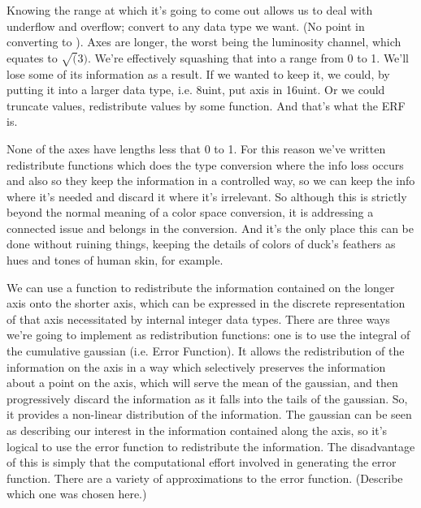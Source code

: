 \documentclass[10pt,a4paper]{article}
\begin{document}
Knowing the range at which it's going to come out allows us to deal with underflow and overflow; convert to any data type we want. (No point in converting to ). Axes are longer, the worst being the luminosity channel, which equates to $\sqrt(3)$. We're effectively squashing that into a range from 0 to 1. We'll lose some of its information as a result. If we wanted to keep it, we could, by putting it into a larger data type, i.e. 8uint, put axis in 16uint. Or we could truncate values, redistribute values by some function. And that's what the ERF is.

None of the axes have lengths less that 0 to 1. For this reason we've written redistribute functions which does the type conversion where the info loss occurs and also so they keep the information in a controlled way, so we can keep the info where it's needed and discard it where it's irrelevant. So although this is strictly beyond the normal meaning of a color space conversion, it is addressing a connected issue and belongs in the conversion. And it's the only place this can be done without ruining things, keeping the details of colors of duck's feathers as hues and tones of human skin, for example.

We can use a function to redistribute the information contained on the longer axis onto the shorter axis, which can be expressed in the discrete representation of that axis necessitated by internal integer data types. There are three ways we're going to implement as redistribution functions: one is to use the integral of the cumulative gaussian (i.e. Error Function). It allows the redistribution of the information on the axis in a way which selectively preserves the information about a point on the axis, which will serve the mean of the gaussian, and then progressively discard the information as it falls into the tails of the gaussian. So, it provides a non-linear distribution of the information. The gaussian can be seen as describing our interest in the information contained along the axis, so it's logical to use the error function to redistribute the information. The disadvantage of this is simply that the computational effort involved in generating the error function. There are a variety of approximations to the error function. (Describe which one was chosen here.)
\end{document}
